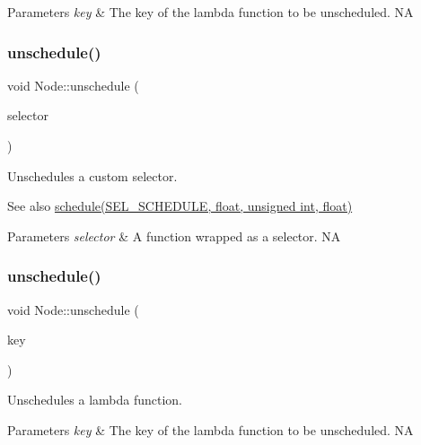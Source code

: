 \begin{DoxyParams}{Parameters}
{\em key} & The key of the lambda function to be unscheduled.  NA \\
\hline
\end{DoxyParams}
\mbox{\label{classNode_a04fd599a10f38d31fa0c07bfda6cc90c}} 
\subsubsection{\texorpdfstring{unschedule()}{unschedule()}\hspace{0.1cm}{\footnotesize\ttfamily [3/4]}}
{\footnotesize\ttfamily void Node\+::unschedule (\begin{DoxyParamCaption}\item[{S\+E\+L\+\_\+\+S\+C\+H\+E\+D\+U\+LE}]{selector }\end{DoxyParamCaption})}

Unschedules a custom selector. \begin{DoxySeeAlso}{See also}
{\ttfamily \hyperlink{classNode_a5957efe46bfe7f83f9adb5b737f7ce11}{schedule(\+S\+E\+L\+\_\+\+S\+C\+H\+E\+D\+U\+L\+E, float, unsigned int, float)}}
\end{DoxySeeAlso}

\begin{DoxyParams}{Parameters}
{\em selector} & A function wrapped as a selector.  NA \\
\hline
\end{DoxyParams}
\mbox{\label{classNode_ad7864aa1e9a8391007eca370628d3ce7}} 
\subsubsection{\texorpdfstring{unschedule()}{unschedule()}\hspace{0.1cm}{\footnotesize\ttfamily [4/4]}}
{\footnotesize\ttfamily void Node\+::unschedule (\begin{DoxyParamCaption}\item[{const std\+::string \&}]{key }\end{DoxyParamCaption})}

Unschedules a lambda function.


\begin{DoxyParams}{Parameters}
{\em key} & The key of the lambda function to be unscheduled.  NA \\
\hline
\end{DoxyParams}
\mbox{\label{classNode_ab8711d9b97d8b944a95c4227c7e9869f}} 
